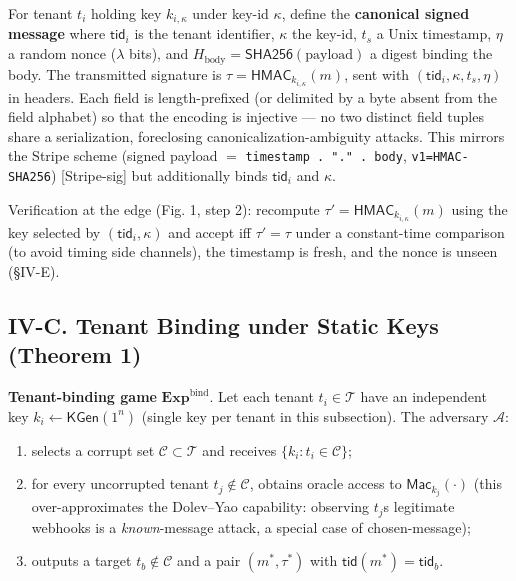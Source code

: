 For tenant \(t_i\) holding key \(k_{i,\kappa}\) under key-id \(\kappa\),
define the \textbf{canonical signed message}
where \(\mathsf{tid}_i\) is the tenant identifier, \(\kappa\) the
key-id, \(t_s\) a Unix timestamp, \(\eta\) a random nonce (\(\lambda\)
bits), and \(H_{\text{body}}=\mathsf{SHA256}(\text{payload})\) a digest
binding the body. The transmitted signature is
\(\tau=\mathsf{HMAC}_{k_{i,\kappa}}(m)\), sent with
\((\mathsf{tid}_i,\kappa,t_s,\eta)\) in headers. Each field is
length-prefixed (or delimited by a byte absent from the field alphabet)
so that the encoding is injective --- no two distinct field tuples share
a serialization, foreclosing canonicalization-ambiguity attacks. This
mirrors the Stripe scheme (signed payload \(=\)
\passthrough{\lstinline!timestamp . "." . body!},
\passthrough{\lstinline!v1=HMAC-SHA256!}) {[}Stripe-sig{]} but
additionally binds \(\mathsf{tid}_i\) and \(\kappa\).

Verification at the edge (Fig. 1, step 2): recompute
\(\tau'=\mathsf{HMAC}_{k_{i,\kappa}}(m)\) using the key selected by
\((\mathsf{tid}_i,\kappa)\) and accept iff \(\tau'=\tau\) under a
constant-time comparison (to avoid timing side channels), the timestamp
is fresh, and the nonce is unseen (§IV-E).

\subsection{IV-C. Tenant Binding under Static Keys (Theorem
1)}\label{iv-c-tenant-binding-under-static-keys-theorem-1}

\textbf{Tenant-binding game} \(\mathbf{Exp}^{\text{bind}}\). Let each
tenant \(t_i\in\mathcal{T}\) have an independent key
\(k_i\leftarrow\mathsf{KGen}(1^n)\) (single key per tenant in this
subsection). The adversary \(\mathcal{A}\):

\begin{enumerate}
\def\labelenumi{\arabic{enumi}.}
\tightlist
\item
  selects a corrupt set \(\mathcal{C}\subset\mathcal{T}\) and receives
  \(\{k_i : t_i\in\mathcal{C}\}\);
\item
  for every uncorrupted tenant \(t_j\notin\mathcal{C}\), obtains oracle
  access to \(\mathsf{Mac}_{k_j}(\cdot)\) (this over-approximates the
  Dolev--Yao capability: observing \(t_j\)\textquotesingle s legitimate
  webhooks is a \emph{known}-message attack, a special case of
  chosen-message);
\item
  outputs a target \(t_b\notin\mathcal{C}\) and a pair
  \((m^*,\tau^*)\) with \(\mathsf{tid}(m^*)=
  \mathsf{tid}_b\).
\end{enumerate}

